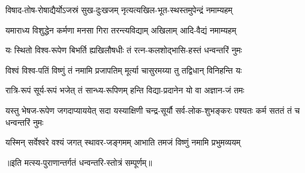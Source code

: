 \twolineshloka
{विषाद-तोष-रोषाद्यैर्योऽजस्रं सुख-दुःखजम्}
{नृत्यत्यखिल-भूत-स्थस्तमुपेन्द्रं नमाम्यहम्}%

\twolineshloka
{यमाराध्य विशुद्धेन कर्मणा मनसा गिरा}
{तरन्त्यविद्याम् अखिलाम् आदि-वैद्यं नमाम्यहम्}%

\twolineshloka
{यः स्थितो विश्व-रूपेण बिभर्ति ह्यखिलौषधीः}
{तं रत्न-कलशोद्भासि-हस्तं धन्वन्तरिं नुमः}%

\twolineshloka
{विश्वं विश्व-पतिं विष्णुं तं नमामि प्रजापतिम्}
{मूर्त्या चासुरमय्या तु तद्विधान् विनिहन्ति यः}%

\twolineshloka
{रात्रि-रूपं सूर्य-रूपं भजेत् तं सान्ध्य-रूपिणम्}
{हन्ति विद्या-प्रदानेन यो वा अज्ञान-जं तमः}%

\threelineshloka
{यस्तु भेषज-रूपेण जगदाप्याययेत् सदा}
{यस्याक्षिणी चन्द्र-सूर्यौ सर्व-लोक-शुभङ्करः}
{पश्यतः कर्म सततं तं च धन्वन्तरिं नुमः}%

\twolineshloka
{यस्मिन् सर्वेश्वरे वश्यं जगत् स्थावर-जङ्गमम्}
{आभाति तमजं विष्णुं नमामि प्रभुमव्ययम्}%

॥इति मत्स्य-पुराणान्तर्गतं धन्वन्तरि-स्तोत्रं सम्पूर्णम्॥
